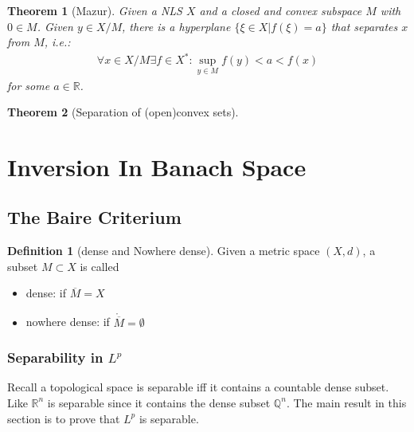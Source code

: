 \documentclass[a4paper,11pt,fleqn]{book}
\newtheorem{theorem}{Theorem}[section]
\theoremstyle{definition}
\newtheorem{definition}{Definition}[section]
\theoremstyle{remark}
\begin{document}
\begin{theorem}[Mazur]
	Given a NLS $X$ and a closed and convex subspace $M$ with $0 \in M$. Given $y \in X \slash M$, there is a hyperplane $\{\xi \in X| f(\xi) = a\}$  that separates $x$ from $M$, i.e.:
	\begin{align*}
		\forall x \in X \slash M \exists f \in X^*: \sup_{y \in M} f(y) < a < f(x)
	\end{align*}
	for some $a \in \mathbb{R}$. 
\end{theorem}

\begin{theorem}[Separation of (open)convex sets]
	
\end{theorem}


\newpage
\section{Inversion In Banach Space}
\subsection{The Baire Criterium}
\begin{definition}[dense and Nowhere dense]
	Given a metric space $(X, d)$, a subset $M \subset X$ is called
	\begin{itemize}
		\item dense: if $\overline{M} = X$
		\item nowhere dense: if  $\mathring{\overline{M}} = \emptyset$
	\end{itemize} 
\end{definition}
\subsubsection{Separability in $L^p$}
Recall a topological space is separable iff it contains a countable dense subset. Like $\mathbb{R}^n$ is separable since it contains the dense subset $\mathbb{Q}^n$. The main result in this section is to prove that $L^p$ is separable.
\end{document}
